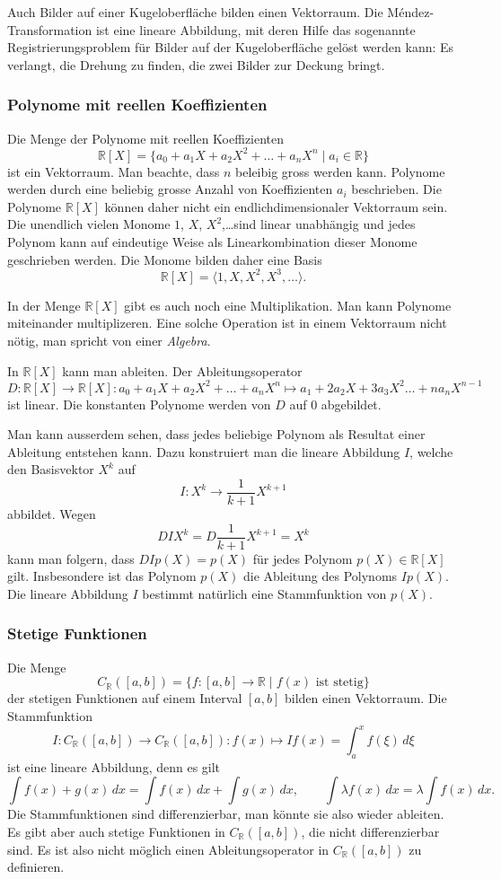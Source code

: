 Auch Bilder auf einer Kugeloberfläche bilden einen Vektorraum.
Die Méndez-Transformation ist eine lineare Abbildung, mit deren Hilfe
das sogenannte Registrierungsproblem für Bilder auf der Kugeloberfläche
gelöst werden kann: Es verlangt, die Drehung zu finden, die zwei Bilder
zur Deckung bringt.

\subsubsection{Polynome mit reellen Koeffizienten}
Die Menge der Polynome mit reellen Koeffizienten
\[
\mathbb R[X]
=
\{
a_0 + a_1X + a_2X^2 + \dots + a_nX^n
\;|\;
a_i\in\mathbb R
\}
\]
ist ein Vektorraum.
Man beachte, dass $n$ beleibig gross werden kann.
Polynome werden durch
eine beliebig grosse Anzahl von Koeffizienten $a_i$ beschrieben.
Die Polynome $\mathbb R[X]$ können daher nicht ein endlichdimensionaler
Vektorraum sein.
Die unendlich vielen Monome $1$, $X$, $X^2$,\dots sind linear unabhängig
und jedes Polynom kann auf eindeutige Weise als Linearkombination dieser
Monome geschrieben werden.
Die Monome bilden daher eine Basis
\[
\mathbb R[X] = \langle 1,X,X^2,X^3,\dots\rangle.
\]

In der Menge $\mathbb R[X]$ gibt es auch noch eine Multiplikation.
Man kann Polynome miteinander multiplizeren.
Eine solche Operation ist in einem Vektorraum nicht nötig, man spricht
von einer {\em Algebra}.
%

In $\mathbb R[X]$ kann man ableiten.
Der Ableitungsoperator
\[
D\colon \mathbb R[X] \to \mathbb R[X]:
a_0+a_1X+a_2X^2+\dots +a_nX^n
\mapsto
a_1+2a_2X+3a_3X^2\dots +na_nX^{n-1}
\]
ist linear.
Die konstanten Polynome werden von $D$ auf $0$ abgebildet.

Man kann ausserdem sehen, dass jedes beliebige Polynom als Resultat
einer Ableitung entstehen kann.
Dazu konstruiert man die lineare Abbildung $I$, welche den Basisvektor
$X^k$ auf
\[
I\colon X^k \to \frac{1}{k+1} X^{k+1}
\]
abbildet.
Wegen
\[
DIX^k = D\frac{1}{k+1}X^{k+1}=X^k
\]
kann man folgern, dass $DIp(X)=p(X)$ für jedes Polynom
$p(X)\in\mathbb R[X]$ gilt.
Insbesondere ist das Polynom $p(X)$ die Ableitung des Polynoms $Ip(X)$.
Die lineare Abbildung $I$ bestimmt natürlich eine Stammfunktion von $p(X)$.


\subsubsection{Stetige Funktionen}
Die Menge
\[
C_{\mathbb R}([a,b]) = \{f:[a,b]\to\mathbb R\;|\; \text{$f(x)$ ist stetig}\}
\]
der stetigen Funktionen auf einem Interval $[a,b]$ bilden einen
Vektorraum.
Die Stammfunktion
\[
I
\colon
C_{\mathbb R}([a,b]) \to C_{\mathbb R}([a,b])
:
f(x) \mapsto If(x) = \int_a^x f(\xi)\,d\xi
\]
ist eine lineare Abbildung, denn es gilt
\[
\int f(x)+g(x)\,dx = \int f(x)\,dx + \int g(x)\,dx,
\qquad
\int \lambda f(x)\,dx = \lambda\int f(x)\,dx.
\]
Die Stammfunktionen sind differenzierbar, man könnte sie also wieder ableiten.
Es gibt aber auch stetige Funktionen in $C_{\mathbb R}([a,b])$, die nicht
differenzierbar sind.
Es ist also nicht möglich einen Ableitungsoperator in $C_{\mathbb R}([a,b])$
zu definieren.

